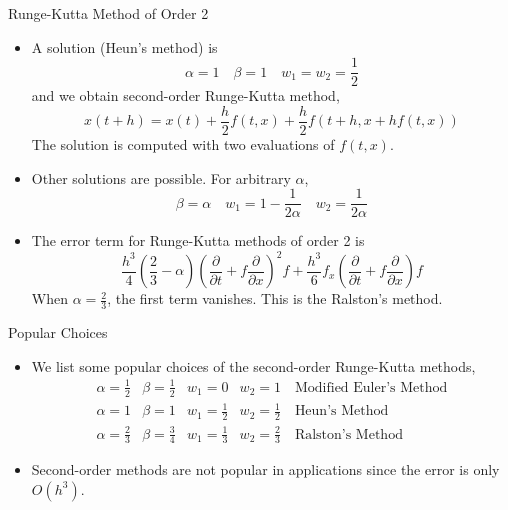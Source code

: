 \documentclass{beamer}
\newcommand{\beforeverb}{\scriptsize}
\newcommand{\afterverb}{\normalsize}
\begin{document}
\begin{frame}{Runge-Kutta Method of Order 2}
\begin{itemize}
\item A solution (\alert{Heun's method}) is 
\beforeverb
\[
\alpha=1\quad \beta=1 \quad w_1=w_2=\frac{1}{2}
\]
\afterverb
and we obtain \alert{second-order Runge-Kutta method},
\[
x(t+h)=x(t)+\frac{h}{2}f(t,x)+\frac{h}{2}f(t+h,x+hf(t,x))
\]
The solution  is computed with \alert{two evaluations} of $f(t,x)$.
\item Other solutions are possible. For arbitrary $\alpha$, 
\beforeverb
\[
\beta=\alpha \quad w_1 =1-\frac{1}{2\alpha} \quad w_2 =\frac{1}{2\alpha}
\]
\afterverb
\item The error term for Runge-Kutta methods of order 2 is 
\beforeverb
\[
\frac{h^3}{4}\left(\frac{2}{3}-\alpha \right) \left(\frac{\partial }{\partial t}+f\frac{\partial }{\partial x}\right)^2 f+\frac{h^3}{6}f_x  \left(\frac{\partial }{\partial t}+f\frac{\partial }{\partial x}\right) f
\]
\afterverb
When $\alpha =\frac{2}{3}$, the first term vanishes. This is the \alert{Ralston's method}. 
\end{itemize}
\end{frame}
\begin{frame}{Popular Choices}

\begin{itemize}
\item We list some popular choices of the second-order Runge-Kutta methods,
\begin{align*}
\alpha=\frac{1}{2} &\beta=\frac{1}{2} &w_1=0 &w_2=1 \quad\mbox{Modified Euler's Method}\\
\alpha=1 &\beta=1 &w_1=\frac{1}{2} &w_2=\frac{1}{2} \quad\mbox{Heun's Method}\\
\alpha=\frac{2}{3} &\beta=\frac{3}{4} &w_1=\frac{1}{3} &w_2=\frac{2}{3} \quad\mbox{Ralston's Method}
\end{align*}
\item Second-order methods are not popular in applications since the error is only $O(h^3)$.
\end{itemize}
\end{frame}
\end{document}
